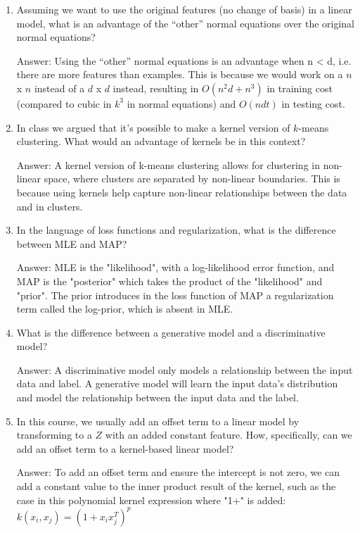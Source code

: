 \documentclass{article}
\newcommand{\gre}[1]{\textcolor{gre}{#1}}
\newcommand\ans[1]{\par\gre{Answer: #1}}
\begin{document}
\begin{enumerate}
\item Assuming we want to use the original features (no change of basis) in a linear model, what is an advantage of the ``other'' normal equations over the original normal equations?

\ans{Using the ``other'' normal equations is an advantage when n < d, i.e. there are more features than examples. This is because we would work on a $n$ x $n$ instead of a $d$ x $d$ instead, resulting in $O(n^2d + n^3)$ in training cost (compared to cubic in $k^3$ in normal equations) and $O(ndt)$ in testing cost.}

\item In class we argued that it's possible to make a kernel version of $k$-means clustering. What would an advantage of kernels be in this context?

\ans{A kernel version of k-means clustering allows for clustering in non-linear space, where clusters are separated by non-linear boundaries. This is because using kernels help capture non-linear relationships between the data and in clusters.}

\item In the language of loss functions and regularization, what is the difference between MLE and MAP?

\ans{MLE is the "likelihood", with a log-likelihood error function, and MAP is the "posterior" which takes the product of the "likelihood" and "prior". The prior introduces in the loss function of MAP a regularization term called the log-prior, which is absent in MLE.}

\item What is the difference between a generative model and a discriminative model?

\ans{A discriminative model only models a relationship between the input data and label. A generative model will learn the input data's distribution and model the relationship between the input data and the label.}

\item In this course, we usually add an offset term to a linear model by transforming to a $Z$ with an added constant feature. How, specifically, can we add an offset term to a kernel-based linear model?

\ans{To add an offset term and ensure the intercept is not zero, we can add a constant value to the inner product result of the kernel, such as the case in this polynomial kernel expression where "1+" is added: $k(x_i,x_j) = (1+x_ix_j^T)^p$}


\end{enumerate}
\end{document}
